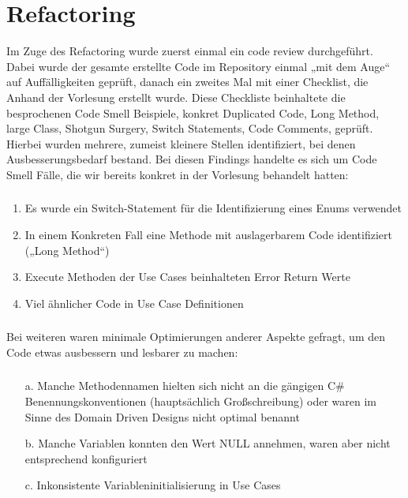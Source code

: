 \chapter{Refactoring}

Im Zuge des Refactoring wurde zuerst einmal ein code review durchgeführt. Dabei wurde der gesamte erstellte Code im Repository einmal „mit dem Auge“ auf Auffälligkeiten geprüft, danach ein zweites Mal mit einer Checklist, die Anhand der Vorlesung erstellt wurde. Diese Checkliste beinhaltete die besprochenen Code Smell Beispiele, konkret Duplicated Code, Long Method, large Class, Shotgun Surgery, Switch Statements, Code Comments, geprüft.
Hierbei wurden mehrere, zumeist kleinere Stellen identifiziert, bei denen Ausbesserungsbedarf bestand. Bei diesen Findings handelte es sich um Code Smell Fälle, die wir bereits konkret in der Vorlesung behandelt hatten:
\subsection*{}
\begin{enumerate}
\item Es wurde ein Switch-Statement für die Identifizierung eines Enums verwendet
\item In einem Konkreten Fall eine Methode mit auslagerbarem Code identifiziert („Long Method“)
\item Execute Methoden der Use Cases beinhalteten Error Return Werte
\item Viel ähnlicher Code in Use Case Definitionen
\end{enumerate}
\subsection*{}
Bei weiteren waren minimale Optimierungen anderer Aspekte gefragt, um den Code etwas ausbessern und lesbarer zu machen:
\subsection*{}
\begin{enumerate}
\item[a.] Manche Methodennamen hielten sich nicht an die gängigen C\# Benennungskonventionen (hauptsächlich Großschreibung) oder waren im Sinne des Domain Driven Designs nicht optimal benannt
\item[b.] Manche Variablen konnten den Wert NULL annehmen, waren aber nicht entsprechend konfiguriert
\item[c.] Inkonsistente Variableninitialisierung in Use Cases
\end{enumerate}
